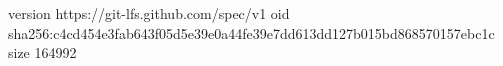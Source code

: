 version https://git-lfs.github.com/spec/v1
oid sha256:c4cd454e3fab643f05d5e39e0a44fe39e7dd613dd127b015bd868570157ebc1c
size 164992
